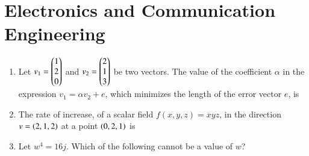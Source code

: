 \documentclass[a4paper, 11pt]{article}
\begin{document}
\section*{Electronics and Communication Engineering }
\begin{enumerate}
    \item Let $v_1 = \begin{pmatrix}1 \\ 2 \\ 0\end{pmatrix}$ and $v_2 = \begin{pmatrix}2 \\ 1 \\ 3\end{pmatrix}$ be two vectors. The value of the coefficient $\alpha$ in the expression $v_1 = \alpha v_2 + e$, which minimizes the length of the error vector $e$, is
    
    \begin{enumerate}
    \end{enumerate}
    
    \hfill{}
    
    \item The rate of increase, of a scalar field $f(x,y,z) = xyz$, in the direction $v=\left(2,1,2\right)$ at a point $\left(0,2,1\right)$ is
    
    \begin{enumerate}
    \end{enumerate}
    
    \hfill{}

    \item Let $w^4 = 16j$. Which of the following cannot be a value of $w$?
    
    \begin{enumerate}
    \end{enumerate}
    

\end{enumerate}
\end{document}
